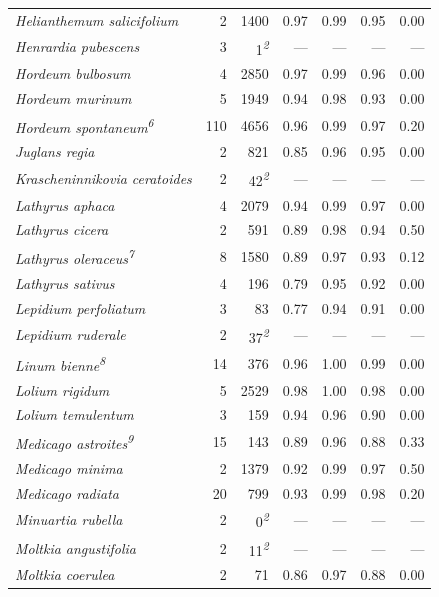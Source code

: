 \documentclass[
  authoryear,
  preprint]{elsarticle}
\begin{document}
\begin{longtable}{@{\extracolsep{\fill}}lrrrrrr}
{\itshape Helianthemum salicifolium} & 2 & 1400 & 0.97 & 0.99 & 0.95 & 0.00 \\ 
{\itshape Henrardia pubescens} & 3 & 1\textsuperscript{\textit{2}} & — & — & — & — \\ 
{\itshape Hordeum bulbosum} & 4 & 2850 & 0.97 & 0.99 & 0.96 & 0.00 \\ 
{\itshape Hordeum murinum} & 5 & 1949 & 0.94 & 0.98 & 0.93 & 0.00 \\ 
{\itshape Hordeum spontaneum}\textsuperscript{\textit{6}} & 110 & 4656 & 0.96 & 0.99 & 0.97 & 0.20 \\ 
{\itshape Juglans regia} & 2 & 821 & 0.85 & 0.96 & 0.95 & 0.00 \\ 
{\itshape Krascheninnikovia ceratoides} & 2 & 42\textsuperscript{\textit{2}} & — & — & — & — \\ 
{\itshape Lathyrus aphaca} & 4 & 2079 & 0.94 & 0.99 & 0.97 & 0.00 \\ 
{\itshape Lathyrus cicera} & 2 & 591 & 0.89 & 0.98 & 0.94 & 0.50 \\ 
{\itshape Lathyrus oleraceus}\textsuperscript{\textit{7}} & 8 & 1580 & 0.89 & 0.97 & 0.93 & 0.12 \\ 
{\itshape Lathyrus sativus} & 4 & 196 & 0.79 & 0.95 & 0.92 & 0.00 \\ 
{\itshape Lepidium perfoliatum} & 3 & 83 & 0.77 & 0.94 & 0.91 & 0.00 \\ 
{\itshape Lepidium ruderale} & 2 & 37\textsuperscript{\textit{2}} & — & — & — & — \\ 
{\itshape Linum bienne}\textsuperscript{\textit{8}} & 14 & 376 & 0.96 & 1.00 & 0.99 & 0.00 \\ 
{\itshape Lolium rigidum} & 5 & 2529 & 0.98 & 1.00 & 0.98 & 0.00 \\ 
{\itshape Lolium temulentum} & 3 & 159 & 0.94 & 0.96 & 0.90 & 0.00 \\ 
{\itshape Medicago astroites}\textsuperscript{\textit{9}} & 15 & 143 & 0.89 & 0.96 & 0.88 & 0.33 \\ 
{\itshape Medicago minima} & 2 & 1379 & 0.92 & 0.99 & 0.97 & 0.50 \\ 
{\itshape Medicago radiata} & 20 & 799 & 0.93 & 0.99 & 0.98 & 0.20 \\ 
{\itshape Minuartia rubella} & 2 & 0\textsuperscript{\textit{2}} & — & — & — & — \\ 
{\itshape Moltkia angustifolia} & 2 & 11\textsuperscript{\textit{2}} & — & — & — & — \\ 
{\itshape Moltkia coerulea} & 2 & 71 & 0.86 & 0.97 & 0.88 & 0.00 \\ 

\end{longtable}
\end{document}
